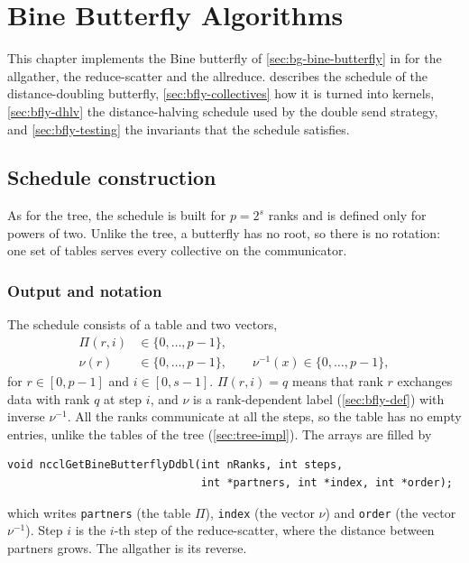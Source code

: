 \chapter{Bine Butterfly Algorithms}\label{ch:butterfly}

\makeatletter
\setlength{\@fptop}{0pt}
\setlength{\@fpsep}{20pt plus 2pt}
\setlength{\@fpbot}{0pt plus 1fil}
\makeatother


This chapter implements the Bine butterfly of \cref{sec:bg-bine-butterfly} in \nccl{} for the allgather, the reduce-scatter and the allreduce.
 describes the schedule of the distance-doubling butterfly, \cref{sec:bfly-collectives} how it is turned into kernels, \cref{sec:bfly-dhlv} the distance-halving schedule used by the double send strategy, and \cref{sec:bfly-testing} the invariants that the schedule satisfies.

\section{Schedule construction}\label{sec:bfly-impl}

As for the tree, the schedule is built for $p=2^s$ ranks and is defined only for powers of two.
Unlike the tree, a butterfly has no root, so there is no rotation: one set of tables serves every collective on the communicator.

\subsection{Output and notation}

The schedule consists of a table and two vectors,
\begin{align}
  \Pi(r,i) &\in \{0,\dots,p-1\}, \\
  \nu(r) &\in \{0,\dots,p-1\}, \qquad \nu^{-1}(x)\in\{0,\dots,p-1\},
\end{align}
for $r\in[0,p-1]$ and $i\in[0,s-1]$.
$\Pi(r,i)=q$ means that rank $r$ exchanges data with rank $q$ at step $i$, and $\nu$ is a rank-dependent label (\cref{sec:bfly-def}) with inverse $\nu^{-1}$.
All the ranks communicate at all the steps, so the table has no empty entries, unlike the tables of the tree (\cref{sec:tree-impl}).
The arrays are filled by
\begin{verbatim}
void ncclGetBineButterflyDdbl(int nRanks, int steps,
                              int *partners, int *index, int *order);
\end{verbatim}
which writes \texttt{partners} (the table $\Pi$), \texttt{index} (the vector $\nu$) and \texttt{order} (the vector $\nu^{-1}$).
Step $i$ is the $i$-th step of the reduce-scatter, where the distance between partners grows. The allgather is its reverse.


